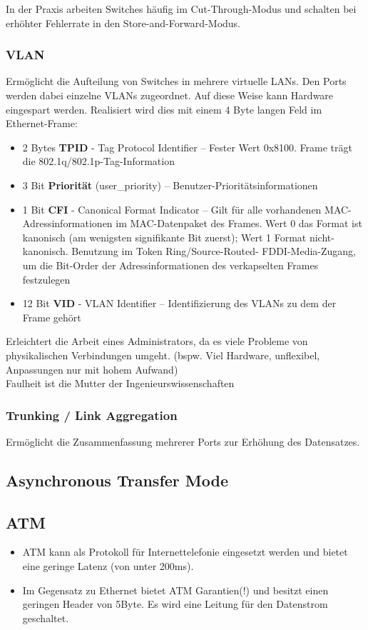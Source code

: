 \documentclass{article} %
\begin{document}
In der Praxis arbeiten Switches häufig im Cut-Through-Modus und schalten bei erhöhter Fehlerrate in den Store-and-Forward-Modus.

\subsubsection{VLAN}

Ermöglicht die Aufteilung von Switches in mehrere virtuelle LANs.
Den Ports werden dabei einzelne VLANs zugeordnet.
Auf diese Weise kann Hardware eingespart werden.
Realisiert wird dies mit einem 4 Byte langen Feld im Ethernet-Frame:
\begin{itemize}
	\item 2 Bytes \textbf{TPID} - Tag Protocol Identifier – Fester Wert 0x8100. Frame
	trägt die 802.1q/802.1p-Tag-Information
	\item 3 Bit \textbf{Priorität} (user\_priority) – Benutzer-Prioritätsinformationen
	\item 1 Bit \textbf{CFI} - Canonical Format Indicator – Gilt für alle vorhandenen
MAC-Adressinformationen im MAC-Datenpaket des Frames. Wert 0
das Format ist kanonisch (am wenigsten signifikante Bit zuerst); Wert
1 Format nicht-kanonisch. Benutzung im Token Ring/Source-Routed-
FDDI-Media-Zugang, um die Bit-Order der Adressinformationen des
verkapselten Frames festzulegen
	\item 12 Bit \textbf{VID} - VLAN Identifier – Identifizierung des VLANs zu dem der
Frame gehört
\end{itemize}
Erleichtert die Arbeit eines Administrators, da es viele Probleme von physikalischen Verbindungen umgeht. (bspw. Viel Hardware, unflexibel, Anpassungen nur mit hohem Aufwand)\\


\glqq Faulheit ist die Mutter der Ingenieurswissenschaften\grqq\\
\subsubsection{Trunking / Link Aggregation}
Ermöglicht die Zusammenfassung mehrerer Ports zur Erhöhung des Datensatzes.

\subsection{Asynchronous Transfer Mode}

\subsection{ATM}
	\begin{itemize}
		\item ATM kann als Protokoll für Internettelefonie eingesetzt werden und bietet eine geringe Latenz (von unter 200ms).
		\item Im Gegensatz zu Ethernet bietet ATM Garantien(!) und besitzt einen geringen Header von 5Byte. Es wird eine Leitung für den Datenstrom geschaltet.
		
	\end{itemize}
\end{document}
